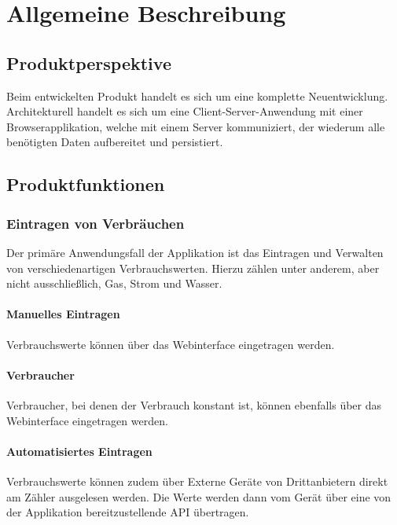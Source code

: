 \section{Allgemeine Beschreibung}


\subsection{Produktperspektive}


Beim entwickelten Produkt handelt es sich um eine komplette Neuentwicklung.
Architekturell handelt es sich um eine Client-Server-Anwendung mit einer Browserapplikation,
welche mit einem Server kommuniziert, der wiederum alle benötigten Daten aufbereitet und persistiert.

\subsection{Produktfunktionen}

\subsubsection{Eintragen von Verbräuchen}

Der primäre Anwendungsfall der Applikation ist das Eintragen und Verwalten von verschiedenartigen Verbrauchswerten.
Hierzu zählen unter anderem, aber nicht ausschließlich, Gas, Strom und Wasser.

\paragraph{Manuelles Eintragen}

Verbrauchswerte können über das Webinterface eingetragen werden.

\paragraph{Verbraucher}
Verbraucher, bei denen der Verbrauch konstant ist, können ebenfalls über das Webinterface eingetragen werden.

\paragraph{Automatisiertes Eintragen}
\label{autom_eintragen}

Verbrauchswerte können zudem über Externe Geräte von Drittanbietern direkt am Zähler ausgelesen werden.
Die Werte werden dann vom Gerät über eine von der Applikation bereitzustellende API übertragen.

